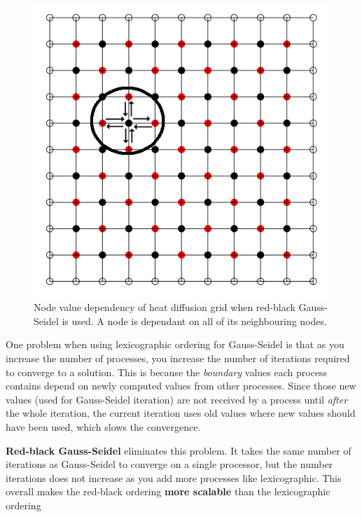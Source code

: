 \documentclass{article}
\begin{document}
\begin{figure}
	\centering
	\includegraphics[scale=0.5]{figures/redblack-gauss.png}
	\caption{Node value dependency of heat diffusion grid when red-black Gauss-Seidel is used. A node is dependant on all of its neighbouring nodes.}
	\label{fig:redblack-gauss}
\end{figure}

One problem when using lexicographic ordering for Gauss-Seidel is that as you increase the number of processes, you increase the number of iterations required to converge to a solution. This is because the \textit{boundary} values each process contains depend on newly computed values from other processes. Since those new values (used for Gauss-Seidel iteration) are not received by a process until \textit{after} the whole iteration, the current iteration uses old values where new values should have been used, which slows the convergence.

\textbf{Red-black Gauss-Seidel} eliminates this problem. It takes the same number of iterations as Gauss-Seidel to converge on a single processor, but the number iterations does not increase as you add more processes like lexicographic. This overall makes the red-black ordering \textbf{more scalable} than the lexicographic ordering
\end{document}
